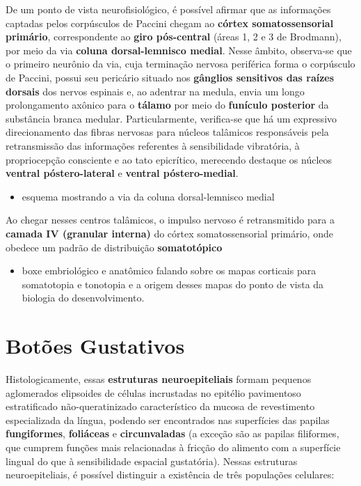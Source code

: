 \documentclass[
]{book}
\providecommand{\tightlist}{%
  \setlength{\itemsep}{0pt}\setlength{\parskip}{0pt}}
\theoremstyle{definition}
\theoremstyle{definition}
\theoremstyle{definition}
\theoremstyle{definition}
\theoremstyle{remark}
\begin{document}
De um ponto de vista neurofisiológico, é possível afirmar que as informações captadas pelos corpúsculos de Paccini chegam ao \textbf{córtex somatossensorial primário}, correspondente ao \textbf{giro pós-central} (áreas 1, 2 e 3 de Brodmann), por meio da via \textbf{coluna dorsal-lemnisco medial}. Nesse âmbito, observa-se que o primeiro neurônio da via, cuja terminação nervosa periférica forma o corpúsculo de Paccini, possui seu pericário situado nos \textbf{gânglios sensitivos das raízes dorsais} dos nervos espinais e, ao adentrar na medula, envia um longo prolongamento axônico para o \textbf{tálamo} por meio do \textbf{funículo posterior} da substância branca medular. Particularmente, verifica-se que há um expressivo direcionamento das fibras nervosas para núcleos talâmicos responsáveis pela retransmissão das informações referentes à sensibilidade vibratória, à propriocepção consciente e ao tato epicrítico, merecendo destaque os núcleos \textbf{ventral póstero-lateral} e \textbf{ventral póstero-medial}.

\begin{itemize}
\tightlist
\item
  esquema mostrando a via da coluna dorsal-lemnisco medial
\end{itemize}

Ao chegar nesses centros talâmicos, o impulso nervoso é retransmitido para a \textbf{camada IV (granular interna)} do córtex somatossensorial primário, onde obedece um padrão de distribuição \textbf{somatotópico}

\begin{itemize}
\tightlist
\item
  boxe embriológico e anatômico falando sobre os mapas corticais para somatotopia e tonotopia e a origem desses mapas do ponto de vista da biologia do desenvolvimento.
\end{itemize}

\hypertarget{botuxf5es-gustativos}{%
\chapter{Botões Gustativos}\label{botuxf5es-gustativos}}

Histologicamente, essas \textbf{estruturas neuroepiteliais} formam pequenos aglomerados elipsoides de células incrustadas no epitélio pavimentoso estratificado não-queratinizado característico da mucosa de revestimento especializada da língua, podendo ser encontrados nas superfícies das papilas \textbf{fungiformes}, \textbf{foliáceas} e \textbf{circunvaladas} (a exceção são as papilas filiformes, que cumprem funções mais relacionadas à fricção do alimento com a superfície lingual do que à sensibilidade espacial gustatória). Nessas estruturas neuroepiteliais, é possível distinguir a existência de três populações celulares:
\end{document}

